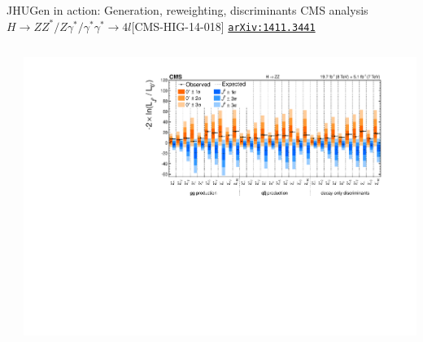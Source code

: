 \documentclass[usenames,dvipsnames,svgnames,table]{beamer}
\newcommand{\arxiv}[1]{\href{http://arxiv.org/abs/#1}{\nolinkurl{arXiv:#1}}}
\begin{document}
\begin{frame}{JHUGen in action: Generation, reweighting, discriminants}{
CMS analysis $H \to ZZ^*/Z\gamma^*/\gamma^*\gamma^* \to 4l$\hfill [CMS-HIG-14-018] \arxiv{1411.3441}
}
\begin{columns}
\begin{column}{0.6\textwidth}
\end{column}
\begin{column}{0.4\textwidth}
\includegraphics[width=\textwidth]{HVV/JP_SummaryPlot}
\end{column}
\end{columns}
\end{frame}
\end{document}
